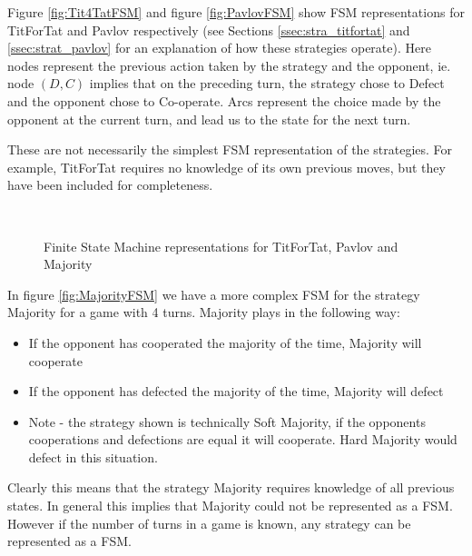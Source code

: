 Figure \ref{fig:Tit4TatFSM} and figure \ref{fig:PavlovFSM} show FSM representations for TitForTat and Pavlov respectively (see Sections \ref{ssec:stra_titfortat} and \ref{ssec:strat_pavlov} for an explanation of how these strategies operate).
Here nodes represent the previous action taken by the strategy and the opponent, ie. node $(D, C)$ implies that on the preceding turn, the strategy chose to Defect and the opponent chose to Co-operate.
Arcs represent the choice made by the opponent at the current turn, and lead us to the state for the next turn.

These are not necessarily the simplest FSM representation of the strategies.
For example, TitForTat requires no knowledge of its own previous moves, but they have been included for completeness.

\begin{figure}[hbtp!]
\centering
{}
\\
\caption{Finite State Machine representations for TitForTat, Pavlov and Majority}
\end{figure}

In figure \ref{fig:MajorityFSM} we have a more complex FSM for the strategy Majority for a game with 4 turns.
Majority plays in the following way:

\begin{itemize}
  \item If the opponent has cooperated the majority of the time, Majority will cooperate
  \item If the opponent has defected the majority of the time, Majority will defect
  \item Note - the strategy shown is technically Soft Majority, if the opponents cooperations and defections are equal it will cooperate. Hard Majority would defect in this situation.
\end{itemize}

Clearly this means that the strategy Majority requires knowledge of all previous states.
In general this implies that Majority could not be represented as a FSM.
However if the number of turns in a game is known, any strategy can be represented as a FSM.

